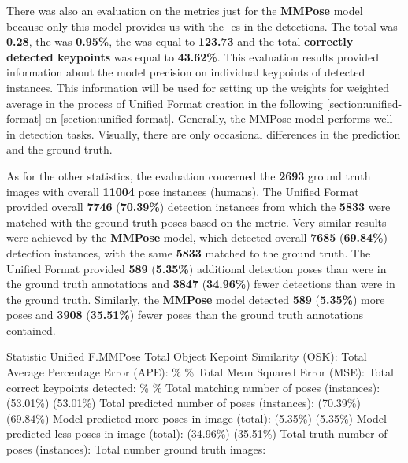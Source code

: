 
There was also an evaluation on the metrics just for the {\bf MMPose} model because only this model provides us with the \BBOX\--es in the detections. The total {\bf \OKS} was {\bf 0.28}, the {\bf \APE} was {\bf 0.95\%}, the {\bf \MSE} was equal to {\bf 123.73} and the total {\bf correctly detected keypoints} was equal to {\bf 43.62\%}. This evaluation results provided information about the model precision on individual keypoints of detected instances. This information will be used for setting up the weights for weighted average in the process of Unified Format creation in the following [section:unified-format] on [section:unified-format]. Generally, the MMPose model performs well in detection tasks. Visually, there are only occasional differences in the prediction and the ground truth.

As for the other statistics, the evaluation concerned the {\bf 2693} ground truth images with overall {\bf 11004} pose instances (humans). The Unified Format provided overall {\bf 7746} ({\bf 70.39\%}) detection instances from which the {\bf 5833} were matched with the ground truth poses based on the {\bf \IoU} metric. Very similar results were achieved by the {\bf MMPose} model, which detected overall {\bf 7685} ({\bf 69.84\%}) detection instances, with the same {\bf 5833} matched to the ground truth. The Unified Format provided {\bf 589} ({\bf 5.35\%}) additional detection poses than were in the ground truth annotations and {\bf 3847} ({\bf 34.96\%}) fewer detections than were in the ground truth. Similarly, the {\bf MMPose} model detected {\bf 589} ({\bf 5.35\%}) more poses and {\bf 3908} ({\bf 35.51\%}) fewer poses than the ground truth annotations contained.

 \setupTABLE[r][1][style=bold]
 \setupTABLE[c][each][offset=3dd]
 \setupTABLE[frame=off]
 \setupTABLE[r][1][topframe=on,bottomframe=on]
 \setupTABLE[c][each][leftframe=on]
 \setupTABLE[c][1][leftframe=off]
 \setupTABLE[c][2,3][align=middle]
 \bTR\bTD Statistic \eTD\bTD Unified F.\eTD\bTD MMPose\eTD\eTR
 \bTR\bTD Total Object Kepoint Similarity (OSK): \eTD{} \eTD{} \eTD\eTR
 \bTR\bTD Total Average Percentage Error (APE): \eTD{}\% \eTD{}\% \eTD\eTR
 \bTR\bTD Total Mean Squared Error (MSE): \eTD{} \eTD{} \eTD\eTR
 \bTR\bTD Total correct keypoints detected: \eTD{}\% \eTD{}\% \eTD\eTR
 \bTR\bTD Total matching number of poses (instances): \eTD{} (53.01\%) \eTD{} (53.01\%) \eTD\eTR
 \bTR\bTD Total predicted number of poses (instances):\eTD{} (70.39\%) \eTD{} (69.84\%) \eTD\eTR
 \bTR\bTD Model predicted more poses in image (total):\eTD{} (5.35\%)\eTD{} (5.35\%) \eTD\eTR
 \bTR\bTD Model predicted less poses in image (total):\eTD{} (34.96\%)\eTD{} (35.51\%) \eTD\eTR
 \bTR\bTD Total truth number of poses (instances): \eTD{} \eTD{} \eTD\eTR
 \bTR\bTD Total number ground truth images: \eTD{} \eTD{} \eTD\eTR

